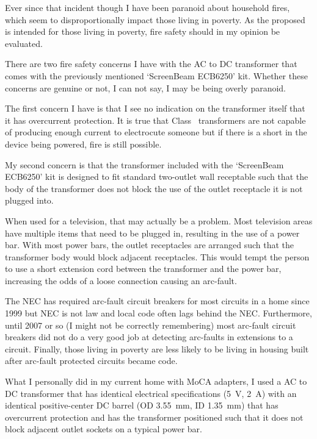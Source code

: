 Ever since that incident though I have been paranoid about household fires, which seem to disproportionally
impact those living in poverty. As the proposed  is intended for those living in
poverty, fire safety should in my opinion be evaluated.

There are two fire safety concerns I have with the AC to DC transformer that comes with the previously
mentioned `ScreenBeam ECB6250' kit. Whether these concerns are genuine or not, I can not say, I may
be being overly paranoid.

The first concern I have is that I see no indication on the transformer itself that it has overcurrent
protection. It is true that Class~ transformers are not capable of producing enough current to
electrocute someone but if there is a short in the device being powered, fire is still possible.

My second concern is that the transformer included with the `ScreenBeam ECB6250' kit is designed to fit
standard two-outlet wall receptable such that the body of the transformer does not block the use of
the outlet receptacle it is not plugged into.

When used for a television, that may actually be a problem. Most television areas have multiple items
that need to be plugged in, resulting in the use of a power bar. With most power bars, the outlet
receptacles are arranged such that the transformer body would block adjacent receptacles. This would
tempt the person to use a short extension cord between the transformer and the power bar, increasing
the odds of a loose connection causing an arc-fault.

The NEC has required arc-fault circuit breakers for most circuits in a home since 1999 but NEC is
not law and local code often lags behind the NEC. Furthermore, until 2007 or so (I might not be
correctly remembering) most arc-fault circuit breakers did not do a very good job at detecting
arc-faults in extensions to a circuit. Finally, those living in poverty are less likely to be
living in housing built after arc-fault protected circuits became code.

What I personally did in my current home with MoCA adapters, I used a
 AC to DC transformer that has identical
electrical specifications (\SI{5}{\volt}, \SI{2}{\ampere}) with an identical positive-center
DC barrel (OD \SI{3.55}{\milli\meter}, ID \SI{1.35}{\milli\meter}) that has overcurrent protection
and has the transformer positioned such that it does not block adjacent outlet sockets on a
typical power bar.


